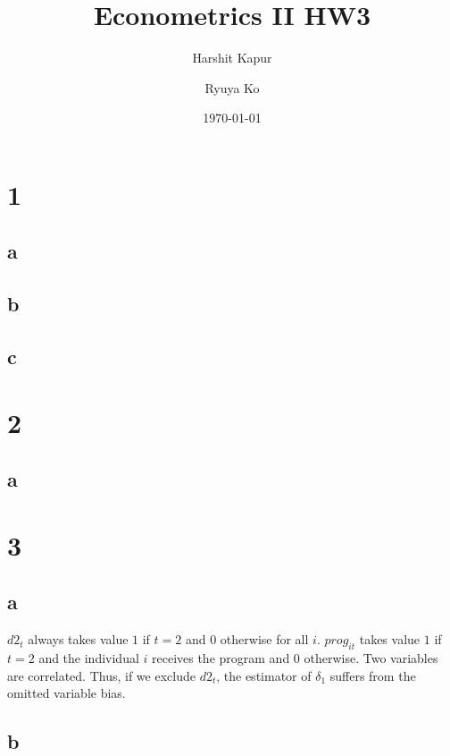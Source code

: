 \documentclass[11pt]{article}
\begin{document}
\title{Econometrics II HW3} %
\author[1]{Harshit Kapur}
\author[2]{Ryuya Ko}
\date{\today}

\maketitle

\pagebreak

\section*{1}

\subsection*{a}

\subsection*{b}

\subsection*{c}
\section*{2}
\subsection*{a}


\section*{3}
\subsection*{a}

$d2_t$ always takes value $1$ if $t = 2$ and $0$ otherwise for all $i$. $prog_{it}$ takes value $1$ if $t = 2$ and the individual $i$ receives the program and $0$ otherwise. Two variables are correlated. Thus, if we exclude $d2_t$, the estimator of $\delta_1$ suffers from the omitted variable bias.

\subsection*{b}
\end{document}
